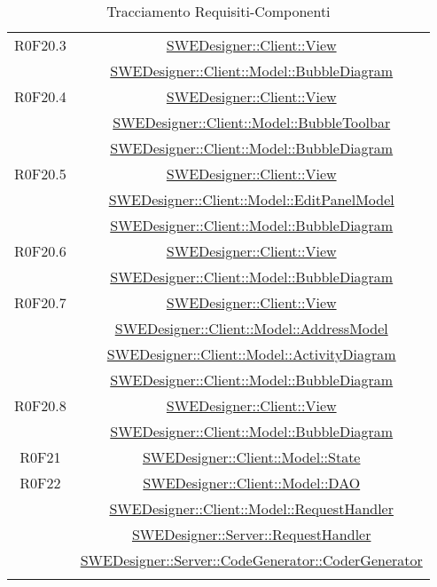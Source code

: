 \documentclass[../SpecificaTecnica.tex]{subfiles}
\begin{document}
\begin{longtable}{|c|c|}
		R0F20.3 & \hyperlink{SWEDesigner::Client::View}{SWEDesigner::Client::View} \\& \hyperlink{SWEDesigner::Client::Model::BubbleDiagram}{SWEDesigner::Client::Model::BubbleDiagram}\\\hline
		R0F20.4 & \hyperlink{SWEDesigner::Client::View}{SWEDesigner::Client::View} \\& \hyperlink{SWEDesigner::Client::Model::BubbleToolbar}{SWEDesigner::Client::Model::BubbleToolbar} \\& \hyperlink{SWEDesigner::Client::Model::BubbleDiagram}{SWEDesigner::Client::Model::BubbleDiagram} \\\hline
		R0F20.5 & \hyperlink{SWEDesigner::Client::View}{SWEDesigner::Client::View} \\& \hyperlink{SWEDesigner::Client::Model::EditPanelModel}{SWEDesigner::Client::Model::EditPanelModel} \\& \hyperlink{SWEDesigner::Client::Model::BubbleDiagram}{SWEDesigner::Client::Model::BubbleDiagram}\\\hline
		R0F20.6 & \hyperlink{SWEDesigner::Client::View}{SWEDesigner::Client::View} \\& \hyperlink{SWEDesigner::Client::Model::BubbleDiagram}{SWEDesigner::Client::Model::BubbleDiagram}\\\hline
		R0F20.7 & \hyperlink{SWEDesigner::Client::View}{SWEDesigner::Client::View} \\& \hyperlink{SWEDesigner::Client::Model::AddressModel}{SWEDesigner::Client::Model::AddressModel} \\& \hyperlink{SWEDesigner::Client::Model::ActivityDiagram}{SWEDesigner::Client::Model::ActivityDiagram} \\& \hyperlink{SWEDesigner::Client::Model::BubbleDiagram}{SWEDesigner::Client::Model::BubbleDiagram}\\\hline
		R0F20.8 & \hyperlink{SWEDesigner::Client::View}{SWEDesigner::Client::View} \\& \hyperlink{SWEDesigner::Client::Model::BubbleDiagram}{SWEDesigner::Client::Model::BubbleDiagram}\\\hline
		R0F21 & \hyperlink{SWEDesigner::Client::Model::State}{SWEDesigner::Client::Model::State}\\\hline
		R0F22 & \hyperlink{SWEDesigner::Client::Model::DAO}{SWEDesigner::Client::Model::DAO} \\& \hyperlink{SWEDesigner::Client::Model::RequestHandler}{SWEDesigner::Client::Model::RequestHandler} \\& \hyperlink{SWEDesigner::Server::RequestHandler}{SWEDesigner::Server::RequestHandler} \\& \hyperlink{SWEDesigner::Server::CodeGenerator::CoderGenerator}{SWEDesigner::Server::CodeGenerator::CoderGenerator} \\\hline
		\caption[Tracciamento Requisiti-Componenti]{Tracciamento Requisiti-Componenti}
		\label{tabella:requisiti-componenti}
	\end{longtable}
	\clearpage
	
\end{document}
